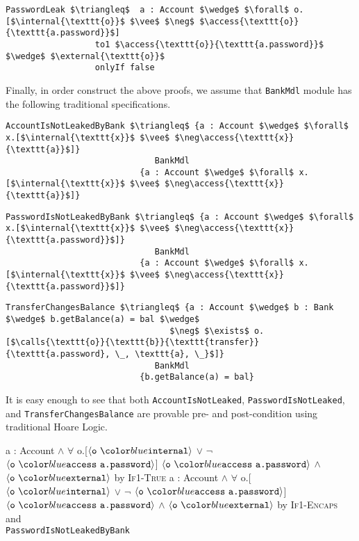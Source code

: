 \begin{lstlisting}[language = Chainmail, mathescape=true, frame=lines]
PasswordLeak $\triangleq$  a : Account $\wedge$ $\forall$ o.[$\internal{\texttt{o}}$ $\vee$ $\neg$ $\access{\texttt{o}}{\texttt{a.password}}$]
                  to1 $\access{\texttt{o}}{\texttt{a.password}}$ $\wedge$ $\external{\texttt{o}}$
                  onlyIf false
\end{lstlisting}
Finally, in order construct the above proofs, we assume that \texttt{BankMdl} module 
has the following traditional specifications.
\begin{lstlisting}[language = Chainmail, mathescape=true, frame=lines]
AccountIsNotLeakedByBank $\triangleq$ {a : Account $\wedge$ $\forall$ x.[$\internal{\texttt{x}}$ $\vee$ $\neg\access{\texttt{x}}{\texttt{a}}$]} 
                              BankMdl 
                           {a : Account $\wedge$ $\forall$ x.[$\internal{\texttt{x}}$ $\vee$ $\neg\access{\texttt{x}}{\texttt{a}}$]}
\end{lstlisting}
\begin{lstlisting}[language = Chainmail, mathescape=true, frame=lines]
PasswordIsNotLeakedByBank $\triangleq$ {a : Account $\wedge$ $\forall$ x.[$\internal{\texttt{x}}$ $\vee$ $\neg\access{\texttt{x}}{\texttt{a.password}}$]} 
                              BankMdl 
                           {a : Account $\wedge$ $\forall$ x.[$\internal{\texttt{x}}$ $\vee$ $\neg\access{\texttt{x}}{\texttt{a.password}}$]}
\end{lstlisting}
\begin{lstlisting}[language = Chainmail, mathescape=true, frame=lines]
TransferChangesBalance $\triangleq$ {a : Account $\wedge$ b : Bank $\wedge$ b.getBalance(a) = bal $\wedge$ 
                                 $\neg$ $\exists$ o.[$\calls{\texttt{o}}{\texttt{b}}{\texttt{transfer}}{\texttt{a.password}, \_, \texttt{a}, \_}$]}
                              BankMdl 
                           {b.getBalance(a) = bal}
\end{lstlisting}
It is easy enough to see that both \texttt{AccountIsNotLeaked}, \texttt{PasswordIsNotLeaked}, and \texttt{TransferChangesBalance} are provable
pre- and post-condition using traditional Hoare Logic.

\begin{proofexample}
\proofsteps
	{\onlyIfSingleEx
			{a : Account $\wedge$ $\forall$ o.[$\internal{\texttt{o}}$ $\vee$ $\neg$ $\access{\texttt{o}}{\texttt{a.password}}$]}
			{$\access{\texttt{o}}{\texttt{a.password}}$ $\wedge$ $\external{\texttt{o}}$}
			{\true}
			}
		{by \textsc{If1-True}}
	{\onlyIfSingleEx
			{a : Account $\wedge$ $\forall$ o.[$\internal{\texttt{o}}$ $\vee$ $\neg$ $\access{\texttt{o}}{\texttt{a.password}}$]}
			{$\access{\texttt{o}}{\texttt{a.password}}$ $\wedge$ $\external{\texttt{o}}$}
			{\false}}
		{by \textsc{If1-Encaps} and\\ \texttt{PasswordIsNotLeakedByBank}}
\endproofsteps
\end{proofexample}

